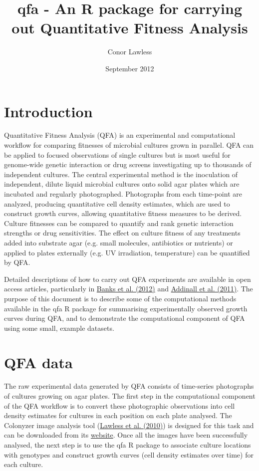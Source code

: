 \documentclass [a4paper]{article}
\title{qfa - An R package for carrying out Quantitative Fitness Analysis}
\author{Conor Lawless}
\date{September 2012}
\begin{document}
\maketitle

\section{Introduction}

Quantitative Fitness Analysis (QFA) is an experimental and computational workflow for comparing fitnesses of microbial cultures grown in parallel.  QFA can be applied to focused observations of single cultures but is most useful for genome-wide genetic interaction or drug screens investigating up to thousands of independent cultures.  The central experimental method is the inoculation of independent, dilute liquid microbial cultures onto solid agar plates which are incubated and regularly photographed.  Photographs from each time-point are analyzed, producing quantitative cell density estimates, which are used to construct growth curves, allowing quantitative fitness measures to be derived.  Culture fitnesses can be compared to quantify and rank genetic interaction strengths or drug sensitivities. The effect on culture fitness of any treatments added into substrate agar (e.g. small molecules, antibiotics or nutrients) or applied to plates externally (e.g. UV irradiation, temperature) can be quantified by QFA.

Detailed descriptions of how to carry out QFA experiments are available in open access articles, particularly in \href{http://dx.doi.org/10.3791/4018}{Banks et al. (2012)} and  \href{http://dx.doi.org/10.1371/journal.pgen.1001362}{Addinall et al. (2011)}.  The purpose of this document is to describe some of the computational methods available in the qfa R package for summarising experimentally observed growth curves during QFA, and to demonstrate the computational component of QFA using some small, example datasets.

\section{QFA data}

The raw experimental data generated by QFA consists of time-series photographs of cultures growing on agar plates.  The first step in the computational component of the QFA workflow is to convert these photographic observations into cell density estimates for cultures in each position on each plate analysed.  The Colonyzer image analysis tool (\href{http://dx.doi.org/10.1186/1471-2105-11-287}{Lawless et al. (2010)}) is designed for this task and can be downloaded from its \href{http://research.ncl.ac.uk/colonyzer/}{website}.  Once all the images have been successfully analysed, the next step is to use the qfa R package to associate culture locations with genotypes and construct growth curves (cell density estimates over time) for each culture.
\end{document}
